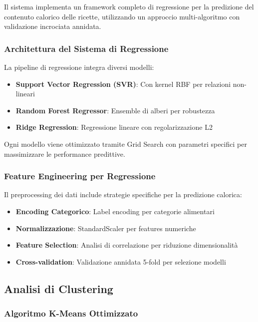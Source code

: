 \documentclass[12pt,a4paper]{article}
\begin{document}
Il sistema implementa un framework completo di regressione per la predizione del contenuto calorico delle ricette, utilizzando un approccio multi-algoritmo con validazione incrociata annidata.

\subsubsection{Architettura del Sistema di Regressione}

La pipeline di regressione integra diversi modelli:
\begin{itemize}
    \item \textbf{Support Vector Regression (SVR)}: Con kernel RBF per relazioni non-lineari
    \item \textbf{Random Forest Regressor}: Ensemble di alberi per robustezza
    \item \textbf{Ridge Regression}: Regressione lineare con regolarizzazione L2
\end{itemize}

Ogni modello viene ottimizzato tramite Grid Search con parametri specifici per massimizzare le performance predittive.

\subsubsection{Feature Engineering per Regressione}

Il preprocessing dei dati include strategie specifiche per la predizione calorica:

\begin{itemize}
    \item \textbf{Encoding Categorico}: Label encoding per categorie alimentari
    \item \textbf{Normalizzazione}: StandardScaler per features numeriche
    \item \textbf{Feature Selection}: Analisi di correlazione per riduzione dimensionalità
    \item \textbf{Cross-validation}: Validazione annidata 5-fold per selezione modelli
\end{itemize}

\subsection{Analisi di Clustering}

\subsubsection{Algoritmo K-Means Ottimizzato}
\end{document}
